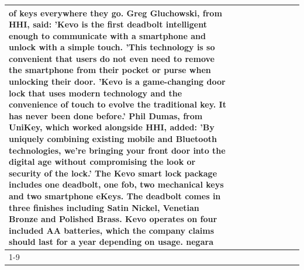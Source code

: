 \begin{table}[H]
\begin{tabular}{lllrlllll}
of keys everywhere they go. Greg Gluchowski, from HHI, said: 'Kevo is the first deadbolt intelligent enough to communicate with a smartphone and unlock with a simple touch. 'This technology is so convenient that users do not even need to remove the smartphone from their pocket or purse when unlocking their door. 'Kevo is a game-changing door lock that uses modern technology and the convenience of touch to evolve the traditional key. It has never been done before.' Phil Dumas, from UniKey, which worked alongside HHI, added: 'By uniquely combining existing mobile and Bluetooth technologies, we’re bringing your front door into the digital age without compromising the look or security of the lock.' The Kevo smart lock package includes one deadbolt, one fob, two mechanical keys and two smartphone eKeys. The deadbolt comes in three finishes including Satin Nickel, Venetian Bronze and Polished Brass. Kevo operates on four included AA batteries, which the company claims should last for a year depending on usage. negara \\
\cline{1-9}

\end{tabular}
\end{table}
